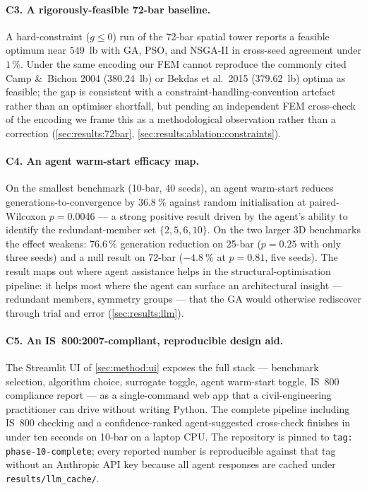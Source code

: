 \paragraph{C3. A rigorously-feasible 72-bar baseline.} A
hard-constraint ($g \le 0$) run of the 72-bar spatial tower
reports a feasible optimum near $\num{549}$~lb with GA, PSO,
and NSGA-II in cross-seed agreement under $\num{1}\,\%$. Under
the same encoding our FEM cannot reproduce the commonly cited
Camp \&~Bichon 2004 (\num{380.24}~lb) or Bekdas et al.~2015
(\num{379.62}~lb) optima as feasible; the gap is consistent
with a constraint-handling-convention artefact rather than an
optimiser shortfall, but pending an independent FEM
cross-check of the encoding we frame this as a
methodological observation rather than a correction
(\cref{sec:results:72bar},
\cref{sec:results:ablation:constraints}).

\paragraph{C4. An agent warm-start efficacy map.} On the smallest
benchmark (10-bar, \num{40} seeds), an agent warm-start reduces
generations-to-convergence by $\num{36.8}~\%$ against random
initialisation at paired-Wilcoxon $p=\num{0.0046}$ --- a strong
positive result driven by the agent's ability to identify the
redundant-member set $\{2, 5, 6, 10\}$. On the two larger 3D
benchmarks the effect weakens: $\num{76.6}\,\%$ generation
reduction on 25-bar ($p=\num{0.25}$ with only three seeds) and
a null result on 72-bar ($-\num{4.8}~\%$ at $p=\num{0.81}$,
five seeds). The result maps out where agent assistance helps in
the structural-optimisation pipeline: it helps most where
the agent can surface an architectural insight --- redundant
members, symmetry groups --- that the GA would otherwise
rediscover through trial and error
(\cref{sec:results:llm}).

\paragraph{C5. An IS~800:2007-compliant, reproducible design
aid.} The Streamlit UI of \cref{sec:method:ui} exposes the full
stack --- benchmark selection, algorithm choice, surrogate
toggle, agent warm-start toggle, IS~800 compliance report --- as
a single-command web app that a civil-engineering practitioner
can drive without writing Python. The complete pipeline
including IS~800 checking and a confidence-ranked
agent-suggested cross-check finishes in under ten seconds on
10-bar on a laptop CPU. The repository is pinned to
\texttt{tag: phase-10-complete}; every reported number is
reproducible against that tag without an Anthropic API key
because all agent responses are cached under
\texttt{results/llm\_cache/}.

